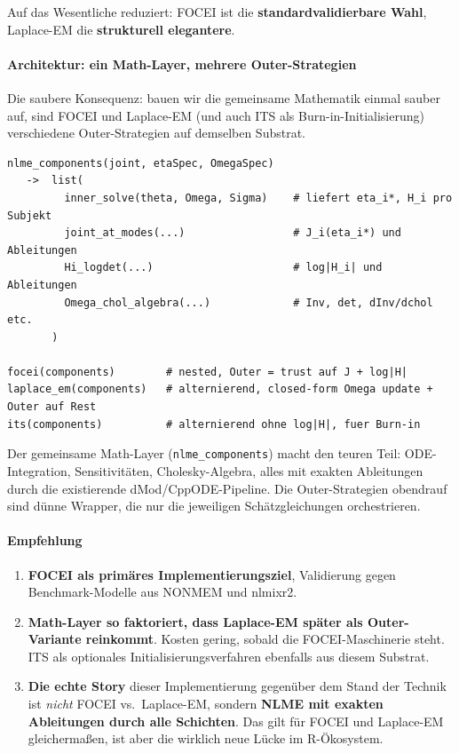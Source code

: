 \documentclass[
]{article}
\providecommand{\tightlist}{%
  \setlength{\itemsep}{0pt}\setlength{\parskip}{0pt}}
\begin{document}
Auf das Wesentliche reduziert: FOCEI ist die
\textbf{standardvalidierbare Wahl}, Laplace-EM die \textbf{strukturell
elegantere}.

\paragraph{Architektur: ein Math-Layer, mehrere
Outer-Strategien}\label{architektur-ein-math-layer-mehrere-outer-strategien}

Die saubere Konsequenz: bauen wir die gemeinsame Mathematik einmal
sauber auf, sind FOCEI und Laplace-EM (und auch ITS als
Burn-in-Initialisierung) verschiedene Outer-Strategien auf demselben
Substrat.

\begin{verbatim}
nlme_components(joint, etaSpec, OmegaSpec)
   ->  list(
         inner_solve(theta, Omega, Sigma)    # liefert eta_i*, H_i pro Subjekt
         joint_at_modes(...)                 # J_i(eta_i*) und Ableitungen
         Hi_logdet(...)                      # log|H_i| und Ableitungen
         Omega_chol_algebra(...)             # Inv, det, dInv/dchol etc.
       )

focei(components)        # nested, Outer = trust auf J + log|H|
laplace_em(components)   # alternierend, closed-form Omega update + Outer auf Rest
its(components)          # alternierend ohne log|H|, fuer Burn-in
\end{verbatim}

Der gemeinsame Math-Layer (\texttt{nlme\_components}) macht den teuren
Teil: ODE-Integration, Sensitivitäten, Cholesky-Algebra, alles mit
exakten Ableitungen durch die existierende dMod/CppODE-Pipeline. Die
Outer-Strategien obendrauf sind dünne Wrapper, die nur die jeweiligen
Schätzgleichungen orchestrieren.

\paragraph{Empfehlung}\label{empfehlung}

\begin{enumerate}
\def\labelenumi{\arabic{enumi}.}
\tightlist
\item
  \textbf{FOCEI als primäres Implementierungsziel}, Validierung gegen
  Benchmark-Modelle aus NONMEM und nlmixr2.
\item
  \textbf{Math-Layer so faktoriert, dass Laplace-EM später als
  Outer-Variante reinkommt}. Kosten gering, sobald die FOCEI-Maschinerie
  steht. ITS als optionales Initialisierungsverfahren ebenfalls aus
  diesem Substrat.
\item
  \textbf{Die echte Story} dieser Implementierung gegenüber dem Stand
  der Technik ist \emph{nicht} FOCEI vs.~Laplace-EM, sondern
  \textbf{NLME mit exakten Ableitungen durch alle Schichten}. Das gilt
  für FOCEI und Laplace-EM gleichermaßen, ist aber die wirklich neue
  Lücke im R-Ökosystem.
\end{enumerate}
\end{document}
